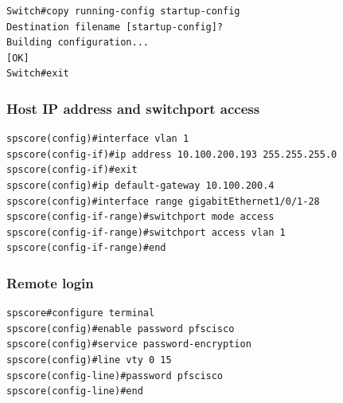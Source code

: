 \documentclass[a4paper,notitlepage]{article}
\begin{document}
\begin{verbatim}
Switch#copy running-config startup-config
Destination filename [startup-config]? 
Building configuration...
[OK]
Switch#exit
\end{verbatim}

\subsubsection{Host IP address and switchport access}

\begin{verbatim}
spscore(config)#interface vlan 1
spscore(config-if)#ip address 10.100.200.193 255.255.255.0
spscore(config-if)#exit
spscore(config)#ip default-gateway 10.100.200.4
spscore(config)#interface range gigabitEthernet1/0/1-28
spscore(config-if-range)#switchport mode access 
spscore(config-if-range)#switchport access vlan 1
spscore(config-if-range)#end
\end{verbatim}

\subsubsection{Remote login}

\begin{verbatim}
spscore#configure terminal
spscore(config)#enable password pfscisco
spscore(config)#service password-encryption 
spscore(config)#line vty 0 15
spscore(config-line)#password pfscisco
spscore(config-line)#end
\end{verbatim}
\end{document}
